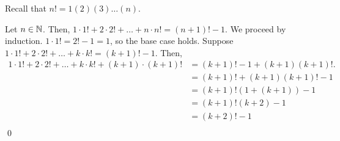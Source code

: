 \documentclass{article}
\begin{document}
\begin{proposition}
  Recall that $n! = 1(2)(3)\ldots(n)$.
\end{proposition}
\begin{example}
  Let $n \in \mathbb{N}$. Then, $1 \cdot 1! + 2 \cdot 2! + \dots + n \cdot n! = (n+1)! - 1$.
  We proceed by induction.
  $1 \cdot 1! = 2! - 1 = 1$, so the base case holds.
  Suppose $1 \cdot 1! + 2 \cdot 2! + \dots + k \cdot k! = (k+1)! - 1$.
  Then,
  \begin{align*}
    1 \cdot 1! + 2 \cdot 2! + \dots + k \cdot k! + (k+1)\cdot (k+1)! &= (k+1)! - 1 + (k+1)(k+1)!.\\
    &=(k+1)! + (k+1)(k+1)! - 1\\
    &= (k+1)! (1 + (k+1)) - 1\\
    &= (k+1)! (k+2) - 1\\
    &= (k+2)! - 1\\
  \end{align*}\qed
\end{example}
\end{document}
